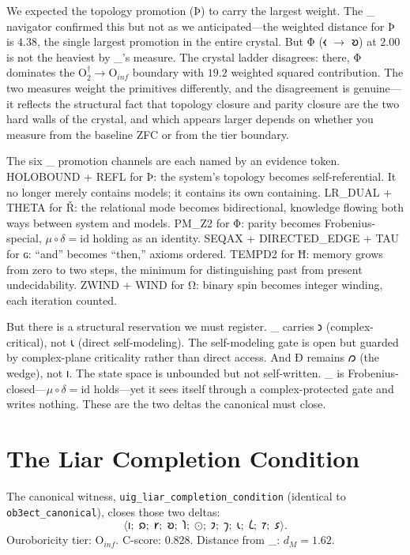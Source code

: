 \documentclass[12pt,twoside]{book}
\theoremstyle{definition}
\newcommand{\ZFCt}{\text{ZFC}_{\tau}}
\newcommand{\moebius}{\mu \circ \delta = \mathrm{id}}
\newcommand{\tier}[1]{\mathrm{O}_{#1}}
\newcommand{\tupledisp}[1]{\langle #1 \rangle}
\begin{document}
We expected the topology promotion (Þ) to carry the largest weight. The \ZFCt{} navigator
confirmed this but not as we anticipated---the weighted distance for Þ is $4.38$, the
single largest promotion in the entire crystal. But Φ (𐑬 $\to$ 𐑹) at $2.00$ is not the
heaviest by \ZFCt's measure. The crystal ladder disagrees: there, Φ dominates the
$\tier{2}^{\dagger} \to \tier{inf}$ boundary with $19.2$ weighted squared contribution.
The two measures weight the primitives differently, and the disagreement is genuine---it
reflects the structural fact that topology closure and parity closure are the two hard
walls of the crystal, and which appears larger depends on whether you measure from the
baseline ZFC or from the tier boundary.

The six \ZFCt{} promotion channels are each named by an evidence token. HOLOBOUND + REFL
for Þ: the system's topology becomes self-referential. It no longer merely contains
models; it contains its own containing. LR\_DUAL + THETA for Ř: the relational mode
becomes bidirectional, knowledge flowing both ways between system and models. PM\_Z2 for
Φ: parity becomes Frobenius-special, $\moebius$ holding as an identity.
SEQAX + DIRECTED\_EDGE + TAU for ɢ: ``and'' becomes ``then,'' axioms ordered. TEMPD2 for
Ħ: memory grows from zero to two steps, the minimum for distinguishing past from present
undecidability. ZWIND + WIND for Ω: binary spin becomes integer winding, each iteration
counted.

But there is a structural reservation we must register. \ZFCt{} carries 𐑮
(complex-critical), not 𐑧 (direct self-modeling). The self-modeling gate is open but
guarded by complex-plane criticality rather than direct access. And Ð remains 𐑼 (the
wedge), not 𐑦. The state space is unbounded but not self-written. \ZFCt{} is
Frobenius-closed---$\moebius$ holds---yet it sees itself through a complex-protected gate
and writes nothing. These are the two deltas the canonical must close.

\section{The Liar Completion Condition}

The canonical witness, \texttt{uig\_liar\_completion\_condition} (identical to
\texttt{ob3ect\_canonical}), closes those two deltas:
\begin{equation}
\tupledisp{
𐑦;\;𐑸;\;𐑾;\;𐑹;\;
𐑐;\;\text{⊙};\;𐑲;\;𐑠;\;
𐑧;\;𐑖;\;𐑳;\;𐑭}.
\end{equation}
Ouroboricity tier: $\tier{inf}$. C-score: $0.828$. Distance from \ZFCt:
$d_M = 1.62$.
\end{document}
